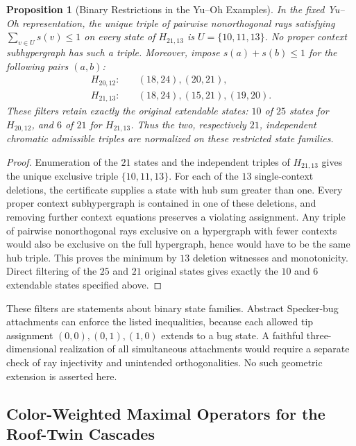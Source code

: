 \documentclass[aps,pra,reprint,superscriptaddress,longbibliography,nofootinbib,floatfix,10pt]{revtex4-2}
\newtheorem{proposition}[theorem]{Proposition}
\theoremstyle{definition}\newtheorem{definition}[theorem]{Definition}
\theoremstyle{remark}\newtheorem{remark}[theorem]{Remark}
\begin{document}
\begin{proposition}[Binary Restrictions in the Yu--Oh Examples]\label{prop:yo-binary-filters}
In the fixed Yu--Oh representation, the unique triple of pairwise nonorthogonal rays satisfying $\sum_{v\in U}s(v)\le1$ on every state of $H_{21,13}$ is $U=\{10,11,13\}$. No proper context subhypergraph has such a triple. Moreover, impose $s(a)+s(b)\le1$ for the following pairs $(a,b)$:
\begin{equation}\label{eq:yo-binary-filters}
\begin{aligned}
H_{20,12}:&\quad (18,24),(20,21),\\
H_{21,13}:&\quad (18,24),(15,21),(19,20).
\end{aligned}
\end{equation}
These filters retain exactly the original extendable states: $10$ of $25$ states for $H_{20,12}$, and $6$ of $21$ for $H_{21,13}$. Thus the two, respectively $21$, independent chromatic admissible triples are normalized on these restricted state families.
\end{proposition}
\begin{proof}
Enumeration of the $21$ states and the independent triples of $H_{21,13}$ gives the unique exclusive triple $\{10,11,13\}$. For each of the $13$ single-context deletions, the certificate supplies a state with hub sum greater than one. Every proper context subhypergraph is contained in one of these deletions, and removing further context equations preserves a violating assignment. Any triple of pairwise nonorthogonal rays exclusive on a hypergraph with fewer contexts would also be exclusive on the full hypergraph, hence would have to be the same hub triple. This proves the minimum by $13$ deletion witnesses and monotonicity. Direct filtering of the $25$ and $21$ original states gives exactly the $10$ and $6$ extendable states specified above.
\end{proof}

These filters are statements about binary state families. Abstract Specker-bug attachments can enforce the listed inequalities, because each allowed tip assignment $(0,0),(0,1),(1,0)$ extends to a bug state. A faithful three-dimensional realization of all simultaneous attachments would require a separate check of ray injectivity and unintended orthogonalities. No such geometric extension is asserted here.


\subsection{Color-Weighted Maximal Operators for the Roof-Twin Cascades}\label{sec:weighted-roofs}
\end{document}
